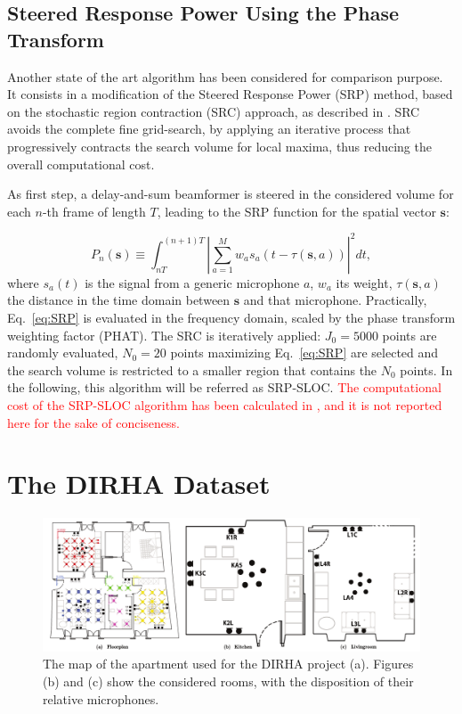 \documentclass[review]{elsarticle}
\let\originaleqref=\eqref
\renewcommand{\eqref}{Eq.~\originaleqref}
\begin{document}
\subsection{Steered Response Power Using the Phase Transform}
Another state of the art algorithm has been considered for comparison purpose. It consists in a modification of the Steered Response Power (SRP) method, based on the stochastic region contraction (SRC) approach, as described in \cite{DoSY07}. SRC avoids the complete fine grid-search, by applying an iterative process that progressively contracts the search volume for local maxima, thus reducing the overall computational cost.

As first step, a delay-and-sum beamformer is steered in the considered volume for each $n$-th frame of length $T$, leading to the SRP function for the spatial vector $\mathbf{s}$:

\begin{equation}
\label{eq:SRP}
P_n(\mathbf{s}) \equiv \int_{nT}^{(n+1)T} \left| \sum_{a=1}^M w_a s_a (t -\tau (\mathbf{s},a))\right|^2 dt,
\end{equation}
where $s_a(t)$ is the signal from a generic microphone $a$, $w_a$ its weight, $\tau (\mathbf{s},a)$ the distance in the time domain between $\mathbf{s}$ and that microphone. Practically, \eqref{eq:SRP} is evaluated in the frequency domain, scaled by the phase transform weighting factor (PHAT). The SRC is iteratively applied: $J_0 = 5000$ points are randomly evaluated, $N_0 = 20$ points maximizing \eqref{eq:SRP} are selected and the search volume is restricted to a smaller region that contains the $N_0$ points. In the following, this algorithm will be referred as SRP-SLOC. \textcolor{red}{The computational cost of the SRP-SLOC algorithm has been calculated in \cite{DoSY07}, and it is not reported here for the sake of conciseness.}


\section{The DIRHA Dataset}
\label{sec:dataset}

\begin{figure}[h]
	\centering
	\includegraphics[width=\textwidth]{imgs/plan}
	\caption{The map of the apartment used for the DIRHA project (a). Figures (b) and (c) show the considered rooms, with the disposition of their relative microphones. }
	\label{fig:DIRHA_map}
\end{figure}
\end{document}
